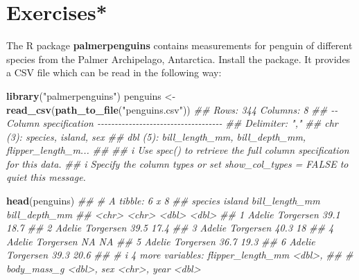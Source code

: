 \documentclass[
  notitlepage]{book}
\newenvironment{Shaded}{\begin{snugshade}}{\end{snugshade}}
\newcommand{\CommentTok}[1]{\textcolor[rgb]{0.56,0.35,0.01}{\textit{#1}}}
\newcommand{\KeywordTok}[1]{\textcolor[rgb]{0.13,0.29,0.53}{\textbf{#1}}}
\newcommand{\NormalTok}[1]{#1}
\newcommand{\StringTok}[1]{\textcolor[rgb]{0.31,0.60,0.02}{#1}}
\begin{document}
\hypertarget{exercises}{%
\section{Exercises*}\label{exercises}}

The R package \textbf{palmerpenguins} contains measurements for penguin of different
species from the Palmer Archipelago, Antarctica. Install the package.
It provides a CSV file which can be read in the following way:

\begin{Shaded}
\begin{Highlighting}[]
\KeywordTok{library}\NormalTok{(}\StringTok{"palmerpenguins"}\NormalTok{)}
\NormalTok{penguins \textless{}{-}}\StringTok{ }\KeywordTok{read\_csv}\NormalTok{(}\KeywordTok{path\_to\_file}\NormalTok{(}\StringTok{"penguins.csv"}\NormalTok{))}
\CommentTok{\#\# Rows: 344 Columns: 8}
\CommentTok{\#\# {-}{-} Column specification {-}{-}{-}{-}{-}{-}{-}{-}{-}{-}{-}{-}{-}{-}{-}{-}{-}{-}{-}{-}{-}{-}{-}{-}{-}{-}{-}{-}{-}{-}{-}{-}{-}{-}{-}{-}}
\CommentTok{\#\# Delimiter: ","}
\CommentTok{\#\# chr (3): species, island, sex}
\CommentTok{\#\# dbl (5): bill\_length\_mm, bill\_depth\_mm, flipper\_length\_m...}
\CommentTok{\#\# }
\CommentTok{\#\# i Use \textasciigrave{}spec()\textasciigrave{} to retrieve the full column specification for this data.}
\CommentTok{\#\# i Specify the column types or set \textasciigrave{}show\_col\_types = FALSE\textasciigrave{} to quiet this message.}
\end{Highlighting}
\end{Shaded}

\begin{Shaded}
\begin{Highlighting}[]
\KeywordTok{head}\NormalTok{(penguins)}
\CommentTok{\#\# \# A tibble: 6 x 8}
\CommentTok{\#\#   species island    bill\_length\_mm bill\_depth\_mm}
\CommentTok{\#\#   \textless{}chr\textgreater{}   \textless{}chr\textgreater{}              \textless{}dbl\textgreater{}         \textless{}dbl\textgreater{}}
\CommentTok{\#\# 1 Adelie  Torgersen           39.1          18.7}
\CommentTok{\#\# 2 Adelie  Torgersen           39.5          17.4}
\CommentTok{\#\# 3 Adelie  Torgersen           40.3          18  }
\CommentTok{\#\# 4 Adelie  Torgersen           NA            NA  }
\CommentTok{\#\# 5 Adelie  Torgersen           36.7          19.3}
\CommentTok{\#\# 6 Adelie  Torgersen           39.3          20.6}
\CommentTok{\#\# \# i 4 more variables: flipper\_length\_mm \textless{}dbl\textgreater{},}
\CommentTok{\#\# \#   body\_mass\_g \textless{}dbl\textgreater{}, sex \textless{}chr\textgreater{}, year \textless{}dbl\textgreater{}}
\end{Highlighting}
\end{Shaded}
\end{document}
